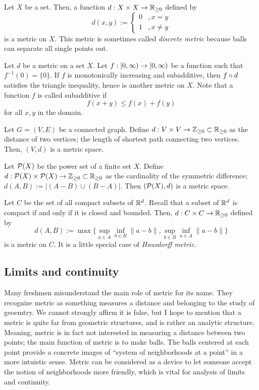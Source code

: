 \documentclass{../crs}
\begin{document}
\begin{ex}\label{ex:discrete metric}
Let $X$ be a set.
Then, a function $d:X\x X\to\R_{\ge0}$ defined by
\[d(x,y):=\begin{cases}0&,x=y\\1&,x\ne y\end{cases}\]
is a metric on $X$.
This metric is sometimes called \emph{discrete metric} because balls can separate all single points out.
\end{ex}
\begin{ex}\label{ex:subadditive function metric}
Let $d$ be a metric on a set $X$.
Let $f:[0,\oo)\to[0,\oo)$ be a function such that $f^{-1}(0)=\{0\}$.
If $f$ is monotonically increasing and subadditive, then $f\circ d$ satisfies the triangle inequality, hence is another metric on $X$.
Note that a function $f$ is called subadditive if
\[f(x+y)\le f(x)+f(y)\]
for all $x,y$ in the domain.
\end{ex}
\begin{ex}
Let $G=(V,E)$ be a connected graph.
Define $d:V\x V\to\Z_{\ge0}\subset\R_{\ge0}$ as the distance of two vertices; the length of shortest path connecting two vertices.
Then, $(V,d)$ is a metric space.
\end{ex}
\begin{ex}
Let $\mathcal{P}(X)$ be the power set of a finite set $X$.
Define $d:\cP(X)\x\cP(X)\to\Z_{\ge0}\subset\R_{\ge0}$ as the cardinality of the symmetric difference; $d(A,B):=|(A-B)\cup(B-A)|$.
Then $(\mathcal{P}(X),d)$ is a metric space.
\end{ex}
\begin{ex}
Let $C$ be the set of all compact subsets of $\mathbb{R}^d$.
Recall that a subset of $\mathbb{R}^d$ is compact if and only if it is closed and bounded.
Then, $d:C\x C\to\R_{\ge0}$ defined by
\[d(A,B):=\max\{\sup_{a\in A}\inf_{b\in B}\|a-b\|,\sup_{b\in B}\inf_{a\in A}\|a-b\|\}\]
is a metric on $C$.
It is a little special case of \emph{Hausdorff metric}.
\end{ex}



\subsection{Limits and continuity}

Many freshmen misunderstand the main role of metric for its name.
They recognize metric as something measures a distance and belonging to the study of geoemtry.
We cannot strongly affirm it is false, but I hope to mention that a metric is quite far from geometric structures, and is rather an analytic structure.
Meaning, metric is in fact not interested in measuring a distance between two points; the main function of metric is to make balls.
The balls centered at each point provide a concrete images of ``system of neighborhoods at a point'' in a more intuistic sense.
Metric can be considered as a device to let someone accept the notion of neighborhoods more friendly, which is vital for analysis of limits and continuity.
\end{document}
